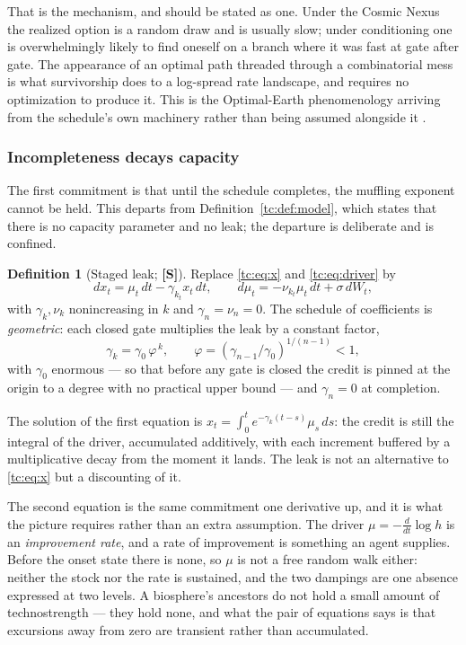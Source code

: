 \documentclass[11pt]{article}
\numberwithin{equation}{section}
\theoremstyle{plain}
\theoremstyle{definition}
\newtheorem{definition}[theorem]{Definition}
\theoremstyle{remark}
\begin{document}
That is the mechanism, and should be stated as one. Under the Cosmic Nexus the
realized option is a random draw and is usually slow; under conditioning
one is overwhelmingly likely to find oneself on a branch where it was
fast at gate after gate. The appearance of an optimal path threaded
through a combinatorial mess is what survivorship does to a log-spread
rate landscape, and requires no optimization to produce it. This is the
Optimal-Earth phenomenology arriving from the schedule's own machinery
rather than being assumed alongside it \cite{Nexus, Ben26Optimal}.

\subsubsection{Incompleteness decays capacity}\label{sch:subsub:leak}

The first commitment is that until the schedule completes, the muffling
exponent cannot be held. This departs from
Definition~\ref{tc:def:model}, which states that there is no capacity
parameter and no leak; the departure is deliberate and is confined.

\begin{definition}[Staged leak; \textbf{[S]}]\label{sch:def:leak}
Replace \eqref{tc:eq:x} and \eqref{tc:eq:driver} by
\begin{equation}\label{sch:eq:leak}
dx_t=\mu_t\,dt-\gamma_{k_t}x_t\,dt,
\qquad
d\mu_t=-\nu_{k_t}\mu_t\,dt+\sigma\,dW_t,
\end{equation}
with $\gamma_k,\nu_k$ nonincreasing in $k$ and $\gamma_n=\nu_n=0$. The
schedule of coefficients is \emph{geometric}: each closed gate
multiplies the leak by a constant factor,
\begin{equation}\label{sch:eq:geomleak}
\gamma_k=\gamma_0\,\varphi^{\,k},\qquad
\varphi=(\gamma_{n-1}/\gamma_0)^{1/(n-1)}<1,
\end{equation}
with $\gamma_0$ enormous --- so that before any gate is closed the credit
is pinned at the origin to a degree with no practical upper bound ---
and $\gamma_n=0$ at completion.
\end{definition}

The solution of the first equation is
$x_t=\int_0^te^{-\gamma_k(t-s)}\mu_s\,ds$: the credit is still the
integral of the driver, accumulated additively, with each increment
buffered by a multiplicative decay from the moment it lands. The leak is
not an alternative to \eqref{tc:eq:x} but a discounting of it.

The second equation is the same commitment one derivative up, and it is
what the picture requires rather than an extra assumption. The driver
$\mu=-\tfrac{d}{dt}\log h$ is an \emph{improvement rate}, and a rate of
improvement is something an agent supplies. Before the onset state there
is none, so $\mu$ is not a free random walk either: neither the stock nor
the rate is sustained, and the two dampings are one absence expressed at
two levels. A biosphere's ancestors do not hold a small amount of
technostrength --- they hold none, and what the pair of equations says is
that excursions away from zero are transient rather than accumulated.
\end{document}
